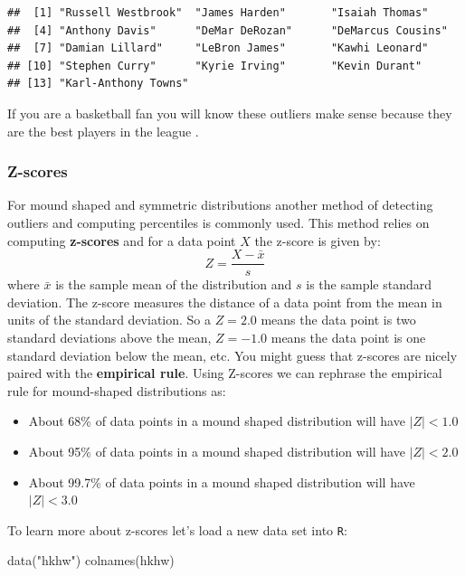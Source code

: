 \documentclass[
]{book}
\newenvironment{Shaded}{\begin{snugshade}}{\end{snugshade}}
\newcommand{\FunctionTok}[1]{\textcolor[rgb]{0.00,0.00,0.00}{#1}}
\newcommand{\NormalTok}[1]{#1}
\newcommand{\StringTok}[1]{\textcolor[rgb]{0.31,0.60,0.02}{#1}}
\providecommand{\tightlist}{%
  \setlength{\itemsep}{0pt}\setlength{\parskip}{0pt}}
\theoremstyle{definition}
\theoremstyle{definition}
\theoremstyle{definition}
\theoremstyle{definition}
\theoremstyle{remark}
\begin{document}
\begin{verbatim}
##  [1] "Russell Westbrook"  "James Harden"       "Isaiah Thomas"     
##  [4] "Anthony Davis"      "DeMar DeRozan"      "DeMarcus Cousins"  
##  [7] "Damian Lillard"     "LeBron James"       "Kawhi Leonard"     
## [10] "Stephen Curry"      "Kyrie Irving"       "Kevin Durant"      
## [13] "Karl-Anthony Towns"
\end{verbatim}

If you are a basketball fan you will know these outliers make sense because they are the best players in the league .

\hypertarget{z-scores}{%
\subsubsection{Z-scores}\label{z-scores}}

For mound shaped and symmetric distributions another method of detecting outliers and computing percentiles is commonly used. This method relies on computing \textbf{z-scores} and for a data point \(X\) the z-score is given by: \[Z=\frac{X-\bar{x}}{s}\] where \(\bar{x}\) is the sample mean of the distribution and \(s\) is the sample standard deviation. The z-score measures the distance of a data point from the mean in units of the standard deviation. So a \(Z=2.0\) means the data point is two standard deviations above the mean, \(Z=-1.0\) means the data point is one standard deviation below the mean, etc. You might guess that z-scores are nicely paired with the \textbf{empirical rule}. Using Z-scores we can rephrase the empirical rule for mound-shaped distributions as:

\begin{itemize}
\tightlist
\item
  About 68\% of data points in a mound shaped distribution will have \(|Z|<1.0\)
\item
  About 95\% of data points in a mound shaped distribution will have \(|Z|<2.0\)
\item
  About 99.7\% of data points in a mound shaped distribution will have \(|Z|< 3.0\)
\end{itemize}

To learn more about z-scores let's load a new data set into \texttt{R}:

\begin{Shaded}
\begin{Highlighting}[]
\FunctionTok{data}\NormalTok{(}\StringTok{"hkhw"}\NormalTok{)}
\FunctionTok{colnames}\NormalTok{(hkhw)}
\end{Highlighting}
\end{Shaded}
\end{document}
